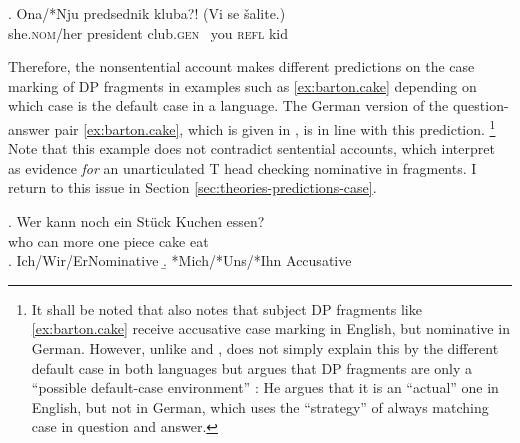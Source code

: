 \exg. Ona/*Nju predsednik kluba?! (Vi se šalite.)\\
she.\textsc{nom}/her president club.\textsc{gen} ~you \textsc{refl} kid\\ 
\hspace{-3em}

Therefore, the nonsentential account makes different predictions on the case marking of DP fragments in examples such as \ref{ex:barton.cake} depending on which case is the default case in a language. The German version of the question-answer pair \ref{ex:barton.cake}, which is given in \Next, is in line with this prediction.%
%
\footnote{It shall be noted that \citet[221]{schutze2001} also notes that subject DP fragments like \ref{ex:barton.cake} receive accusative case marking in English, but nominative in German. However, unlike \citet{barton.progovac2005} and \citet{progovac2006}, \citeauthor{schutze2001} does not simply explain this by the different default case in both languages but argues that DP fragments are only a ``possible default-case environment'' \citep[229]{schutze2001}: He argues that it is an ``actual'' one in English, but not in German, which uses the ``strategy'' of always matching case in question and answer.}\afterfn%
%
Note that this example does not contradict sentential accounts, which interpret \Next as evidence \textit{for} an unarticulated T head checking nominative in fragments. I return to this issue in Section \ref{sec:theories-predictions-case}.
\largerpage

\exg. Wer kann noch ein Stück Kuchen essen?\\
who can more one piece cake eat\\
\a. Ich/Wir/Er\hfill Nominative
\b. *Mich/*Uns/*Ihn \hfill Accusative

